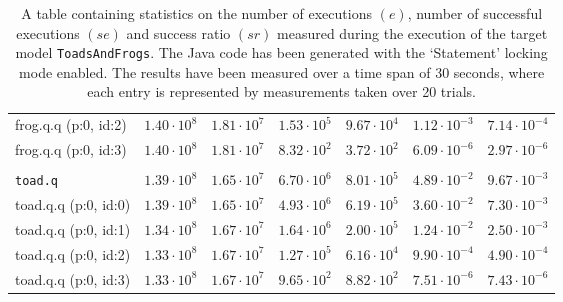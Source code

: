 \begin{table}[htbp]
{\begin{tabular}{lrrrrrr}
\hspace{3mm}frog.q.q (p:0, id:2)              & $1.40 \cdot 10^{8}$ & $1.81 \cdot 10^{7}$ & $1.53 \cdot 10^{5}$ & $9.67 \cdot 10^{4}$ & $1.12 \cdot 10^{-3}$ & $7.14 \cdot 10^{-4}$ \\
\hspace{3mm}frog.q.q (p:0, id:3)              & $1.40 \cdot 10^{8}$ & $1.81 \cdot 10^{7}$ & $8.32 \cdot 10^{2}$ & $3.72 \cdot 10^{2}$ & $6.09 \cdot 10^{-6}$ & $2.97 \cdot 10^{-6}$ \\
\\[-8pt]\texttt{toad.q}                       & $1.39 \cdot 10^{8}$ & $1.65 \cdot 10^{7}$ & $6.70 \cdot 10^{6}$ & $8.01 \cdot 10^{5}$ & $4.89 \cdot 10^{-2}$ & $9.67 \cdot 10^{-3}$ \\
\hspace{3mm}toad.q.q (p:0, id:0)              & $1.39 \cdot 10^{8}$ & $1.65 \cdot 10^{7}$ & $4.93 \cdot 10^{6}$ & $6.19 \cdot 10^{5}$ & $3.60 \cdot 10^{-2}$ & $7.30 \cdot 10^{-3}$ \\
\hspace{3mm}toad.q.q (p:0, id:1)              & $1.34 \cdot 10^{8}$ & $1.67 \cdot 10^{7}$ & $1.64 \cdot 10^{6}$ & $2.00 \cdot 10^{5}$ & $1.24 \cdot 10^{-2}$ & $2.50 \cdot 10^{-3}$ \\
\hspace{3mm}toad.q.q (p:0, id:2)              & $1.33 \cdot 10^{8}$ & $1.67 \cdot 10^{7}$ & $1.27 \cdot 10^{5}$ & $6.16 \cdot 10^{4}$ & $9.90 \cdot 10^{-4}$ & $4.90 \cdot 10^{-4}$ \\
\hspace{3mm}toad.q.q (p:0, id:3)              & $1.33 \cdot 10^{8}$ & $1.67 \cdot 10^{7}$ & $9.65 \cdot 10^{2}$ & $8.82 \cdot 10^{2}$ & $7.51 \cdot 10^{-6}$ & $7.43 \cdot 10^{-6}$ \\
\bottomrule
\end{tabular}
}
\caption{A table containing statistics on the number of executions $(e)$, number of successful executions $(se)$ and success ratio $(sr)$ measured during the execution of the target model \texttt{ToadsAndFrogs}. The Java code has been generated with the `Statement' locking mode enabled. The results have been measured over a time span of 30 seconds, where each entry is represented by measurements taken over 20 trials.}
\label{table:frequency_results_toadsandfrogs_statement}
\end{table}